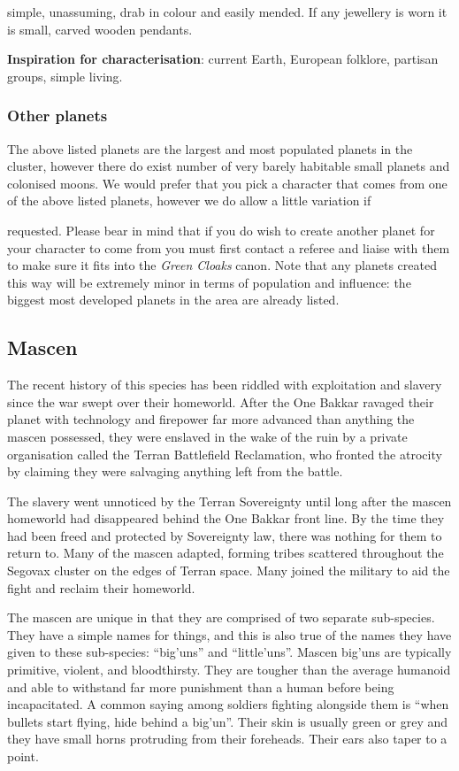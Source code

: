 simple, unassuming, drab in colour and easily mended. If any jewellery is worn it is small, carved wooden pendants.

\textbf{Inspiration for characterisation}: current Earth, European folklore, partisan groups, simple living.

\subsubsection{Other planets}

The above listed planets are the largest and most populated planets in the cluster, however there do exist number of very barely habitable small planets and colonised moons. We would prefer that you pick a character that comes from one of the above listed planets, however we do allow a little variation if

requested. Please bear in mind that if you do wish to create another planet for your character to come from you must first contact a referee and liaise with them to make sure it fits into the \textit{Green Cloaks} canon. Note that any planets created this way will be extremely minor in terms of population and influence: the biggest most developed planets in the area are already listed.

\subsection{Mascen}

The recent history of this species has been riddled with exploitation and slavery since the war swept over their homeworld. After the One Bakkar ravaged their planet with technology and firepower far more advanced than anything the mascen possessed, they were enslaved in the wake of the ruin by a private organisation called the Terran Battlefield Reclamation, who fronted the atrocity by claiming they were salvaging anything left from the battle.

The slavery went unnoticed by the Terran Sovereignty until long after the mascen homeworld had disappeared behind the One Bakkar front line. By the time they had been freed and protected by Sovereignty law, there was nothing for them to return to. Many of the mascen adapted, forming tribes scattered throughout the Segovax cluster on the edges of Terran space. Many joined the military to aid the fight and reclaim their homeworld.

The mascen are unique in that they are comprised of two separate sub-species. They have a simple names for things, and this is also true of the names they have given to these sub-species: ``big'uns'' and ``little'uns''. Mascen big'uns are typically primitive, violent, and bloodthirsty. They are tougher than the average humanoid and able to withstand far more punishment than a human before being incapacitated. A common saying among soldiers fighting alongside them is ``when bullets start flying, hide behind a big'un''. Their skin is usually green or grey and they have small horns protruding from their foreheads. Their ears also taper to a point.

